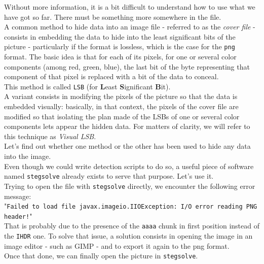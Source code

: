 \documentclass[12pt,a4paper]{article}
\begin{document}
    Without more information, it is a bit difficult to understand how to use
    what we have got so far. There must be something more somewhere in the
    file.\\
    A common method to hide data into an image file - referred to as the
    \textit{cover file} - consists in embedding the data to hide into the least
    significant bits of the picture - particularly if the format is lossless,
    which is the case for the \texttt{png} format.  The basic idea is that for
    each of its pixels, for one or several color components (among red, green,
    blue), the last bit of the byte representing that component of that pixel
    is replaced with a bit of the data to conceal.\\
    This method is called \texttt{LSB} (for \textbf{L}east
    \textbf{S}ignificant \textbf{B}it).\\
    A variant consists in modifying the pixels of the picture so that the data
    is embedded visually: basically, in that context, the pixels of the cover
    file are modified so that isolating the plan made of the LSBs of one or
    several color components lets appear the hidden data. For matters of clarity,
    we will refer to this technique as \textit{Visual LSB}.\\


    Let's find out whether one method or the other has been used to hide any
    data into the image.\\
    Even though we could write detection scripts to do so, a useful piece of
    software named \texttt{stegsolve} already exists to serve that purpose.
    Let's use it.\\

    Trying to open the file with \texttt{stegsolve} directly, we encounter the
    following error message: \\
    "\texttt{Failed to load file javax.imageio.IIOException: I/O error reading PNG header!}"\\
    That is probably due to the presence of the \texttt{aaaa} chunk in first position instead of the \texttt{IHDR} one. To solve that issue, a solution consists in opening the image in an image editor - such as GIMP - and to export it again to the png format.\\

    Once that done, we can finally open the picture in \texttt{stegsolve}.

\end{document}
